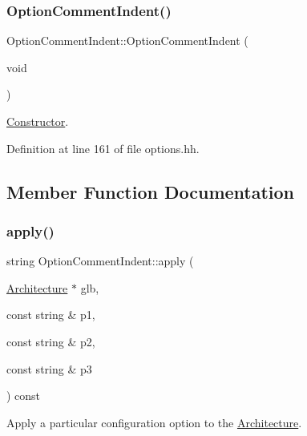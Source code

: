 \subsubsection{\texorpdfstring{OptionCommentIndent()}{OptionCommentIndent()}}
{\footnotesize\ttfamily Option\+Comment\+Indent\+::\+Option\+Comment\+Indent (\begin{DoxyParamCaption}\item[{void}]{ }\end{DoxyParamCaption})\hspace{0.3cm}{\ttfamily [inline]}}



\mbox{\hyperlink{class_constructor}{Constructor}}. 



Definition at line 161 of file options.\+hh.



\subsection{Member Function Documentation}
\mbox{\label{class_option_comment_indent_a1bbaa0f6aea68d413ce9d4c581f71792}} 
\subsubsection{\texorpdfstring{apply()}{apply()}}
{\footnotesize\ttfamily string Option\+Comment\+Indent\+::apply (\begin{DoxyParamCaption}\item[{\mbox{\hyperlink{class_architecture}{Architecture}} $\ast$}]{glb,  }\item[{const string \&}]{p1,  }\item[{const string \&}]{p2,  }\item[{const string \&}]{p3 }\end{DoxyParamCaption}) const\hspace{0.3cm}{\ttfamily [virtual]}}



Apply a particular configuration option to the \mbox{\hyperlink{class_architecture}{Architecture}}. 

